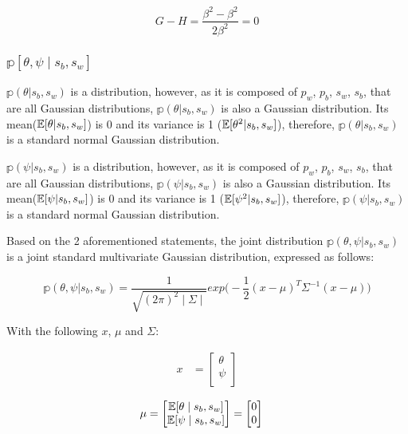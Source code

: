 \documentclass[a4paper,11pt]{article}
\theoremstyle{mytheor}
\newcommand{\E}{\Bbb{E}}
\begin{document}
\begin{equation}
    \label{e_psi_theta_7}
    G-H= \frac{\beta^2-\beta^2}{2\beta^2}=0
\end{equation}

\subsubsection{$\mathbb{p}[\theta,\psi \mid s_b,s_w]$}

$\mathbb{p}(\theta|s_b,s_w)$ is a distribution, however, as it is composed of $p_w$, $p_b$, $s_w$, $s_b$, that are all Gaussian distributions, $\mathbb{p}(\theta|s_b,s_w)$ is also a Gaussian distribution. Its mean($\E[\theta|s_b,s_w]$) is 0 and its variance is 1 ($\E[\theta^2|s_b,s_w]$), therefore, $\mathbb{p}(\theta|s_b,s_w)$ is a standard normal Gaussian distribution.

$\mathbb{p}(\psi|s_b,s_w)$ is a distribution, however, as it is composed of $p_w$, $p_b$, $s_w$, $s_b$, that are all Gaussian distributions, $\mathbb{p}(\psi|s_b,s_w)$ is also a Gaussian distribution. Its mean($\E[\psi|s_b,s_w]$) is 0 and its variance is 1 ($\E[\psi^2|s_b,s_w]$), therefore, $\mathbb{p}(\psi|s_b,s_w)$ is a standard normal Gaussian distribution.

Based on the 2 aforementioned statements, the joint distribution $\mathbb{p}(\theta,\psi|s_b,s_w)$ is a joint standard multivariate Gaussian distribution, expressed as follows:

\begin{equation}
    \label{p_psi_theta}
    \mathbb{p}(\theta,\psi|s_b,s_w)= \frac{1}{\sqrt{(2\pi)^2\mid\Sigma\mid}}exp \Bigg( -\frac{1}{2}(x-\mu)^T\Sigma^{-1}(x-\mu) \Bigg)
\end{equation}

With the following $x$, $\mu$ and $\Sigma$:

\begin{align}
    \label{vec_theta_psi}
    x &= \begin{bmatrix}
           \theta \\
           \psi \\
         \end{bmatrix}
\end{align}

\begin{align}
    \label{vec_theta_psi_mean}
    \mu &= \begin{bmatrix}
           \E[\theta \mid s_b,s_w] \\
           \E[\psi \mid s_b,s_w] \\
         \end{bmatrix} = \begin{bmatrix}
                            0 \\
                            0 \\
                          \end{bmatrix}
\end{align}
\end{document}
